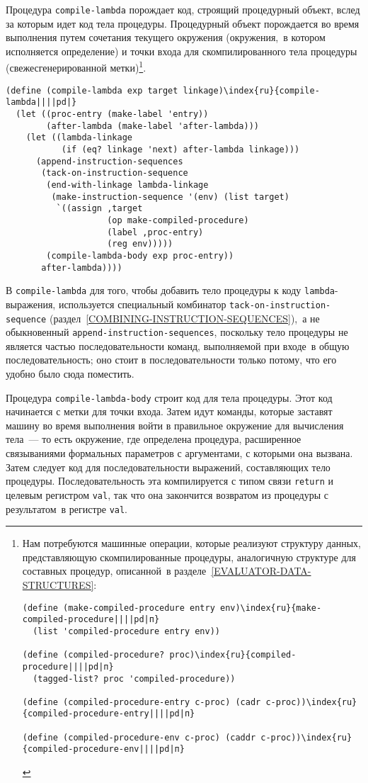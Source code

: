 Процедура {\tt compile-lambda} порождает код,
строящий процедурный объект, вслед за которым идет код тела
процедуры.  Процедурный объект порождается во время выполнения путем
сочетания текущего окружения (окружения,~в котором исполняется
определение) и точки входа для скомпилированного тела процедуры
(свежесгенерированной метки)\footnote{\label{F5.38}
Нам потребуются машинные операции, которые реализуют
структуру данных, представляющую скомпилированные процедуры,
аналогичную структуре для составных процедур, описанной~в 
разделе~\ref{EVALUATOR-DATA-STRUCTURES}:

\begin{Verbatim}
(define (make-compiled-procedure entry env)\index{ru}{make-compiled-procedure||||pd|п}
  (list 'compiled-procedure entry env))

(define (compiled-procedure? proc)\index{ru}{compiled-procedure||||pd|п}
  (tagged-list? proc 'compiled-procedure))

(define (compiled-procedure-entry c-proc) (cadr c-proc))\index{ru}{compiled-procedure-entry||||pd|п}

(define (compiled-procedure-env c-proc) (caddr c-proc))\index{ru}{compiled-procedure-env||||pd|п}
\end{Verbatim}
}.%

\begin{Verbatim}[fontsize=\small]
(define (compile-lambda exp target linkage)\index{ru}{compile-lambda||||pd|}
  (let ((proc-entry (make-label 'entry))
        (after-lambda (make-label 'after-lambda)))
    (let ((lambda-linkage
           (if (eq? linkage 'next) after-lambda linkage)))
      (append-instruction-sequences
       (tack-on-instruction-sequence
        (end-with-linkage lambda-linkage
         (make-instruction-sequence '(env) (list target)
          `((assign ,target
                    (op make-compiled-procedure)
                    (label ,proc-entry)
                    (reg env)))))
        (compile-lambda-body exp proc-entry))
       after-lambda))))
\end{Verbatim}
В {\tt compile-lambda} для того, чтобы добавить тело процедуры
к коду {\tt lambda}-выражения, используется специальный комбинатор
{\tt tack-on-instruction-sequence} 
(раздел~\ref{COMBINING-INSTRUCTION-SEQUENCES}),~а не
обыкновенный {\tt append-instruction-sequences}, поскольку тело
процедуры не является частью последовательности команд, выполняемой
при входе~в общую последовательность; оно стоит в
последовательности только потому, что его удобно было сюда
поместить.
{\sloppy

}
Процедура {\tt compile-lambda-body} строит код для
тела процедуры.  Этот код начинается с метки для точки входа.  Затем
идут команды, которые заставят машину во время выполнения войти в
правильное окружение для вычисления тела~--- то есть окружение,
где определена процедура, расширенное связываниями формальных
параметров с аргументами, с которыми она вызвана. Затем следует
код для последовательности выражений, составляющих тело процедуры.
Последовательность эта компилируется с типом связи {\tt return}
и целевым регистром {\tt val}, так что она закончится возвратом
из процедуры с результатом~в регистре {\tt val}.

